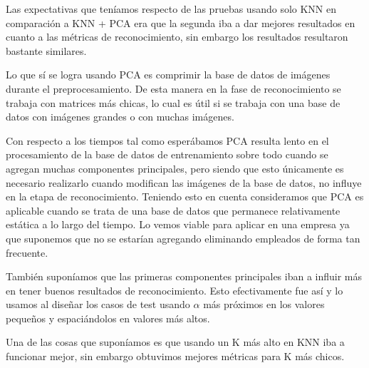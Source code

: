 \par Las expectativas que teníamos respecto de las pruebas usando solo KNN en comparación a KNN + PCA era que la segunda iba a dar mejores resultados en cuanto a las métricas de reconocimiento, sin embargo los resultados resultaron bastante similares.

\par Lo que sí se logra usando PCA es comprimir la base de datos de imágenes durante el preprocesamiento. De esta manera en la fase de reconocimiento se trabaja con matrices más chicas, lo cual es útil si se trabaja con una base de datos con imágenes grandes o con muchas imágenes.

\par Con respecto a los tiempos tal como esperábamos PCA resulta lento en el procesamiento de la base de datos de entrenamiento sobre todo cuando se agregan muchas componentes principales, pero siendo que esto únicamente es necesario realizarlo cuando modifican las imágenes de la base de datos, no influye en la etapa de reconocimiento. Teniendo esto en cuenta consideramos que PCA es aplicable cuando se trata de una base de datos que permanece relativamente estática a lo largo del tiempo. Lo vemos viable para aplicar en una empresa ya que suponemos que no se estarían agregando eliminando empleados de forma tan frecuente.

\par También suponíamos que las primeras componentes principales iban a influir más en tener buenos resultados de reconocimiento. Esto efectivamente fue así y lo usamos al diseñar los casos de test usando $\alpha$ más próximos en los valores pequeños y espaciándolos en valores más altos.
\par Una de las cosas que suponíamos es que usando un K más alto en KNN iba a funcionar mejor, sin embargo obtuvimos mejores métricas para K más chicos.
